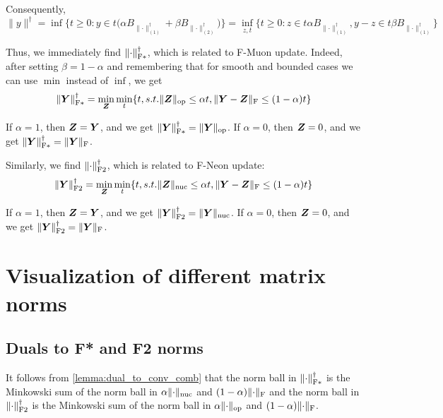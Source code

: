 \documentclass{article} %
\newcommand{\norm}[1]{\lVert #1\rVert}
\DeclarePairedDelimiter{\normf}{\|}{\|_\mathrm{F}}
\DeclarePairedDelimiter{\normfstar}{\|}{\|_\mathrm{F*}}
\DeclarePairedDelimiter{\normftwo}{\|}{\|_\mathrm{F2}}
\DeclarePairedDelimiter{\norms}{\|}{\|_{\mathrm{op}}}
\DeclarePairedDelimiter{\normn}{\|}{\|_{\mathrm{nuc}}}
\begin{document}
Consequently,
\begin{equation}\label{eq:dual_to_conv_comb}
\norm{y}^\dagger
= \inf\bigl\{ t \ge 0 : y \in t\bigl(\alpha B_{\norm{\cdot}_{(1)}^\dagger} + \beta B_{\norm{\cdot}_{(2)}^\dagger}\bigr) \bigr\}
= \inf_{z,t}\bigl\{t \ge 0: z \in t \alpha B_{\norm{\cdot}_{(1)}^\dagger}, y - z \in t \beta B_{\norm{\cdot}_{(1)}^\dagger}\bigr\}
\end{equation}

Thus, we immediately find $\normfstar{\cdot}^\dagger$, which is related to F-Muon update. Indeed, after setting $\beta=1-\alpha$ and remembering that for smooth and bounded cases we can use $\min$ instead of $\inf$, we get 
\begin{equation}\label{eq:normfstardual}
\normfstar{\mY}^\dagger = \min_{\mZ} \min_t\{t, s.t. \norms{\mZ}\leq \alpha t, \normf{\mY-\mZ}\leq (1-\alpha) t\}
\end{equation}

If $\alpha = 1$, then ${\bm{Z}} = {\bm{Y}}$, and we get $\normfstar{\mY}^\dagger = \norms{\mY}$. If $\alpha = 0$, then ${\bm{Z}} = 0$, and we get $\normfstar{\mY}^\dagger = \normf{\mY}$.

Similarly, we find $\normftwo{\cdot}^\dagger$, which is related to F-Neon update:
\begin{equation}\label{eq:normftwodual}
\normftwo{\mY}^\dagger = \min_{\mZ} \min_t\{t, s.t. \normn{\mZ}\leq \alpha t, \normf{\mY-\mZ}\leq (1-\alpha) t\}
\end{equation}

If $\alpha = 1$, then ${\bm{Z}} = {\bm{Y}}$, and we get $\normftwo{\mY}^\dagger = \normn{\mY}$. If $\alpha = 0$, then ${\bm{Z}} = 0$, and we get $\normftwo{\mY}^\dagger = \normf{\mY}$.


\section{Visualization of different matrix norms}
\subsection{Duals to F* and F2 norms}
    
 It follows from \cref{lemma:dual_to_conv_comb} that the norm ball in $\normfstar{\cdot}^\dagger$ is the Minkowski sum of the norm ball in $\alpha\normn{\cdot}$ and $(1-\alpha)\normf{\cdot}$ and the norm ball in $\normftwo{\cdot}^\dagger$ is the Minkowski sum of the norm ball in $\alpha\norms{\cdot}$ and $(1-\alpha)\normf{\cdot}$.
\end{document}

